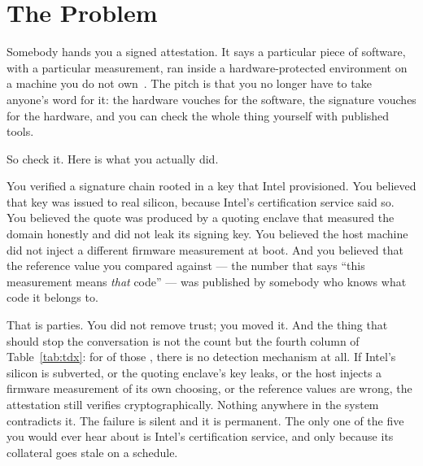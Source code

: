 \documentclass[11pt]{article}
\begin{document}
\clearpage

\tableofcontents
\clearpage

\section{The Problem}
\label{sec:intro}

Somebody hands you a signed attestation. It says a particular piece of
software, with a particular measurement, ran inside a hardware-protected
environment on a machine you do not own~\cite{intelTdx}. The pitch is that you
no longer have
to take anyone's word for it: the hardware vouches for the software, the
signature vouches for the hardware, and you can check the whole thing yourself
with published tools.

So check it. Here is what you actually did.

You verified a signature chain rooted in a key that Intel provisioned. You
believed that key was issued to real silicon, because Intel's certification
service said so. You believed the quote was produced by a quoting enclave
that measured the domain honestly and did not leak its signing key. You
believed the host machine did not inject a different firmware measurement at
boot. And you believed that the reference value you compared against ---
the number that says ``this measurement means \emph{that} code'' --- was
published by somebody who knows what code it belongs to.

That is \SigmaTwoParties{} parties. You did not remove trust; you moved it. And the thing
that should stop the conversation is not the count but the fourth column of
Table~\ref{tab:tdx}: for \SigmaTwoUndetectable{} of those
\SigmaTwoParties{}, there is no detection mechanism
at all. If Intel's silicon is subverted, or the quoting enclave's key leaks,
or the host injects a firmware measurement of its own choosing, or the
reference values are wrong, the attestation still verifies
cryptographically. Nothing anywhere in the system contradicts it. The failure
is silent and it is permanent. The only one of the five you would ever hear
about is Intel's certification service, and only because its collateral goes
stale on a schedule.
\end{document}
